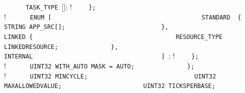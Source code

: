 {{{{{{{{{%
\lstinline!      TASK_TYPE ![];       ! \newline
\lstinline!    };                                       ! \newline
\lstinline!                                             ! \newline
\lstinline!    ! {                  ! \newline
\lstinline!      ENUM [                                 ! \newline
\lstinline!        STANDARD  {                          ! \newline
\lstinline!	     STRING APP_SRC[];                  ! \newline   
\lstinline!        },                                   ! \newline
\lstinline!        LINKED {                             ! \newline
\lstinline!          RESOURCE_TYPE LINKEDRESOURCE;      ! \newline
\lstinline!        },                                   ! \newline
\lstinline!        INTERNAL                             ! \newline
\lstinline!      ] !;       ! \newline
\lstinline!    };                                       ! \newline
\lstinline!                                             ! \newline
\lstinline!    ! {        ! \newline
\lstinline!      UINT32 WITH_AUTO MASK = AUTO;          ! \newline
\lstinline!    };                                       ! \newline
\lstinline!                                             ! \newline
\lstinline!    ! {                   ! \newline
\lstinline!      UINT32 MINCYCLE;                       ! \newline
\lstinline!      UINT32 MAXALLOWEDVALUE;                ! \newline
\lstinline!      UINT32 TICKSPERBASE;                   ! \newline
\lstinline!                                             ! \newline
}}}}}}}}}}}}
